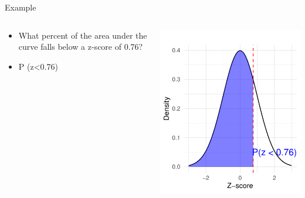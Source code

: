\documentclass[
  ignorenonframetext,
]{beamer}
\providecommand{\tightlist}{%
  \setlength{\itemsep}{0pt}\setlength{\parskip}{0pt}}
\begin{document}
\begin{frame}{Example}
\label{example-1}
\begin{columns}[T]
\begin{column}{0.5\textwidth}
\vspace{1.5cm}

\begin{itemize}
\tightlist
\item
  What percent of the area under the curve falls below a z-score of
  0.76?
\end{itemize}

\begin{itemize}
\tightlist
\item
  P (z\textless0.76)
\end{itemize}
\end{column}

\begin{column}{0.5\textwidth}
\vspace{1cm}

\includegraphics{M5-Hypothesis-Testing,-Probability-and-Distribution_files/figure-beamer/unnamed-chunk-15-1.pdf}
\end{column}
\end{columns}
\end{frame}
\end{document}
